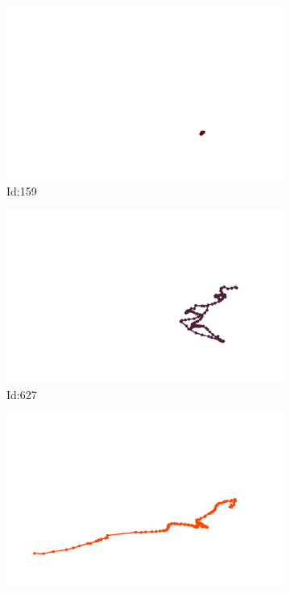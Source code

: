 \documentclass[12pt,twoside]{report}
\begin{document}
\begin{figure}
\centering
\begin{subfigure}[b]{0.20\textwidth}
\centering
\includegraphics[width=\textwidth]{../../trajectories/159.png}
\caption{Id:159}
\end{subfigure}
\begin{subfigure}[b]{0.20\textwidth}
\centering
\includegraphics[width=\textwidth]{../../trajectories/627.png}
\caption{Id:627}
\end{subfigure}
\begin{subfigure}[b]{0.20\textwidth}
\centering
\includegraphics[width=\textwidth]{../../trajectories/751.png}

\end{subfigure}
\end{figure}
\end{document}
